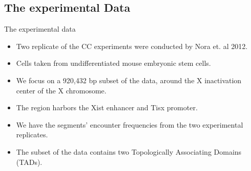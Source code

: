 \documentclass[8pt]{beamer}
\begin{document}
\subsection{The experimental Data}\label{subsection_theExperimentalData}
\begin{frame}{The experimental data}
\begin{itemize}
\item Two replicate of the CC experiments were conducted by Nora et. al 2012. 
\item Cells taken from undifferentiated mouse embryonic stem cells.
\item We focus on a 920,432 bp subset of the data, around the X inactivation center of the X chromosome. 
\item The region harbors the Xist enhancer and Tisx promoter.
\item We have the segments' encounter frequencies from the two experimental replicates.
\item The subset of the data contains two Topologically Associating Domains (TADs).
\end{itemize}
\end{frame}
\end{document}
